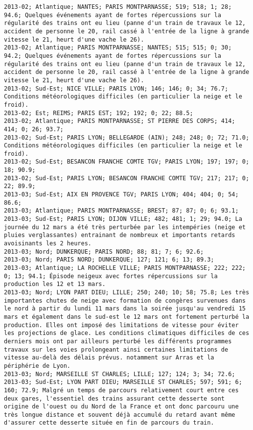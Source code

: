 \documentclass{article}
\begin{document}
\begin{Verbatim}[commandchars=\\\{\}]
2013-02; Atlantique; NANTES; PARIS MONTPARNASSE; 519; 518; 1; 28; 94.6; Quelques événements ayant de fortes répercussions sur la régularité des trains ont eu lieu (panne d'un train de travaux le 12, accident de personne le 20, rail cassé à l'entrée de la ligne à grande vitesse le 21, heurt d'une vache le 26).
2013-02; Atlantique; PARIS MONTPARNASSE; NANTES; 515; 515; 0; 30; 94.2; Quelques événements ayant de fortes répercussions sur la régularité des trains ont eu lieu (panne d'un train de travaux le 12, accident de personne le 20, rail cassé à l'entrée de la ligne à grande vitesse le 21, heurt d'une vache le 26).
2013-02; Sud-Est; NICE VILLE; PARIS LYON; 146; 146; 0; 34; 76.7; Conditions météorologiques difficiles (en particulier la neige et le froid).
2013-02; Est; REIMS; PARIS EST; 192; 192; 0; 22; 88.5; 
2013-02; Atlantique; PARIS MONTPARNASSE; ST PIERRE DES CORPS; 414; 414; 0; 26; 93.7; 
2013-02; Sud-Est; PARIS LYON; BELLEGARDE (AIN); 248; 248; 0; 72; 71.0; Conditions météorologiques difficiles (en particulier la neige et le froid).
2013-02; Sud-Est; BESANCON FRANCHE COMTE TGV; PARIS LYON; 197; 197; 0; 18; 90.9; 
2013-02; Sud-Est; PARIS LYON; BESANCON FRANCHE COMTE TGV; 217; 217; 0; 22; 89.9; 
2013-03; Sud-Est; AIX EN PROVENCE TGV; PARIS LYON; 404; 404; 0; 54; 86.6; 
2013-03; Atlantique; PARIS MONTPARNASSE; BREST; 87; 87; 0; 6; 93.1; 
2013-03; Sud-Est; PARIS LYON; DIJON VILLE; 482; 481; 1; 29; 94.0; La journée du 12 mars a été très perturbée par les intempéries (neige et pluies verglassantes) entrainant de nombreux et importants retards avoisinants les 2 heures.
2013-03; Nord; DUNKERQUE; PARIS NORD; 88; 81; 7; 6; 92.6; 
2013-03; Nord; PARIS NORD; DUNKERQUE; 127; 121; 6; 13; 89.3; 
2013-03; Atlantique; LA ROCHELLE VILLE; PARIS MONTPARNASSE; 222; 222; 0; 13; 94.1; Épisode neigeux avec fortes répercussions sur la production les 12 et 13 mars.
2013-03; Nord; LYON PART DIEU; LILLE; 250; 240; 10; 58; 75.8; Les très importantes chutes de neige avec formation de congères survenues dans le nord à partir du lundi 11 mars dans la soirée jusqu'au vendredi 15 mars et également dans le sud-est le 12 mars ont fortement perturbé la production. Elles ont imposé des limitations de vitesse pour éviter les projections de glace. Les conditions climatiques difficiles de ces derniers mois ont par ailleurs perturbé les différents programmes travaux sur les voies prolongeant ainsi certaines limitations de vitesse au-delà des délais prévus. notamment sur Arras et la périphérie de Lyon.
2013-03; Nord; MARSEILLE ST CHARLES; LILLE; 127; 124; 3; 34; 72.6; 
2013-03; Sud-Est; LYON PART DIEU; MARSEILLE ST CHARLES; 597; 591; 6; 160; 72.9; Malgré un temps de parcours relativement court entre ces deux gares, l'essentiel des trains assurant cette desserte sont origine de l'ouest ou du Nord de la France et ont donc parcouru une très longue distance et souvent déjà accumulé du retard avant même d'assurer cette desserte située en fin de parcours du train.

\end{Verbatim}
\end{document}
